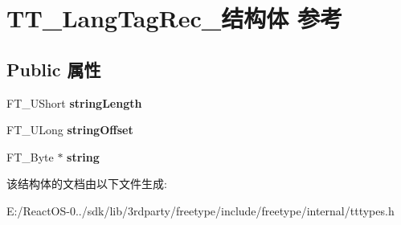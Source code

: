 \hypertarget{struct_t_t___lang_tag_rec__}{}\section{T\+T\+\_\+\+Lang\+Tag\+Rec\+\_\+结构体 参考}
\label{struct_t_t___lang_tag_rec__}
\subsection*{Public 属性}
\begin{DoxyCompactItemize}
\item 
\mbox{\label{struct_t_t___lang_tag_rec___a3795785813bcddf40cbe3e292ac36b32}} 
F\+T\+\_\+\+U\+Short {\bfseries string\+Length}
\item 
\mbox{\label{struct_t_t___lang_tag_rec___a5c66d2e659b94298787a6f9207a397f6}} 
F\+T\+\_\+\+U\+Long {\bfseries string\+Offset}
\item 
\mbox{\label{struct_t_t___lang_tag_rec___a28d58054f6b1218ac9c420d4815bb813}} 
F\+T\+\_\+\+Byte $\ast$ {\bfseries string}
\end{DoxyCompactItemize}


该结构体的文档由以下文件生成\+:\begin{DoxyCompactItemize}
\item 
E\+:/\+React\+O\+S-\/0../sdk/lib/3rdparty/freetype/include/freetype/internal/tttypes.\+h\end{DoxyCompactItemize}
